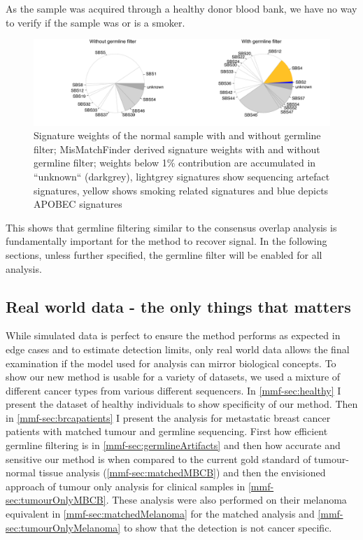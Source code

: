 As the sample was acquired through a healthy donor blood bank, we have no way to verify if the sample was or is a smoker.

\begin{figure}[!ht]
\centering
\includegraphics[width=.99\linewidth]{Figures/MisMatchFinder/noGermlineFilterSignaturesPieChart.pdf}
\caption[Signature weights of the normal sample with and without germline filter]{Signature weights of the normal sample with and without germline filter; MisMatchFinder derived signature weights with and without germline filter; weights below 1\% contribution are accumulated in ``unknown`` (darkgrey), lightgrey signatures show sequencing artefact signatures, yellow shows smoking related signatures and blue depicts APOBEC signatures}\label{fig:mmf-noGermlinePie}
\end{figure}
 

This shows that germline filtering similar to the consensus overlap analysis is fundamentally important for the method to recover signal. In the following sections, unless further specified, the germline filter will be enabled for all analysis.





\subsection{Real world data - the only things that matters}
\label{mmf-sec:realworld}

While simulated data is perfect to ensure the method performs as expected in edge cases and to estimate detection limits, only real world data allows the final examination if the model used for analysis can mirror biological concepts. To show our new method is usable for a variety of datasets, we used a mixture of different cancer types from various different sequencers. In \autoref{mmf-sec:healthy} I present the dataset of healthy individuals to show specificity of our method. Then in \autoref{mmf-sec:brcapatients} I present the analysis for metastatic breast cancer patients with matched tumour and germline sequencing. First how efficient germline filtering is in \autoref{mmf-sec:germlineArtifacts} and then how accurate and sensitive our method is when compared to the current gold standard of tumour-normal tissue analysis (\autoref{mmf-sec:matchedMBCB}) and then the envisioned approach of tumour only analysis for clinical samples in \autoref{mmf-sec:tumourOnlyMBCB}.
These analysis were also performed on their melanoma equivalent in \autoref{mmf-sec:matchedMelanoma} for the matched analysis and \autoref{mmf-sec:tumourOnlyMelanoma} to show that the detection is not cancer specific.

